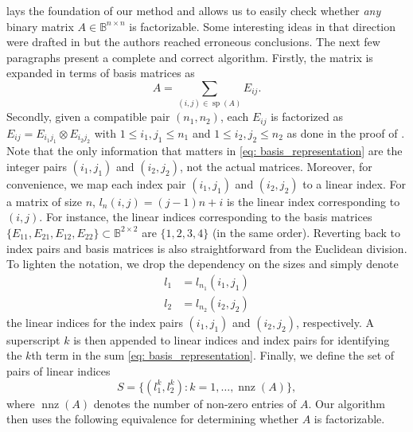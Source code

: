 \documentclass{article}
\numberwithin{equation}{section}
\DeclareMathOperator{\nnz}{\operatorname{nnz}}
\DeclareMathOperator{\sparsity}{\operatorname{sp}}
\theoremstyle{definition}
\begin{document}
 lays the foundation of our method and allows us to easily check whether \emph{any} binary matrix $A \in \mathbb{B}^{n \times n}$ is factorizable. Some interesting ideas in that direction were drafted in \cite{wei2023kronecker} but the authors reached erroneous conclusions. The next few paragraphs present a complete and correct algorithm. Firstly, the matrix is expanded in terms of basis matrices as
\begin{equation}
\label{eq: basis_representation}
    A = \sum_{(i,j) \in \sparsity(A)} E_{ij}.
\end{equation}
Secondly, given a compatible pair $(n_1,n_2)$, each $E_{ij}$ is factorized as $E_{ij} = E_{i_1 j_1} \otimes E_{i_2 j_2}$ with $1 \leq i_1,j_1 \leq n_1$ and $1 \leq i_2,j_2 \leq n_2$ as done in the proof of . Note that the only information that matters in \eqref{eq: basis_representation} are the integer pairs $(i_1,j_1)$ and $(i_2,j_2)$, not the actual matrices. Moreover, for convenience, we map each index pair $(i_1,j_1)$ and $(i_2,j_2)$ to a linear index. For a matrix of size $n$, $l_n(i,j)=(j-1)n+i$ is the linear index corresponding to $(i,j)$. For instance, the linear indices corresponding to the basis matrices $\{E_{11}, E_{21}, E_{12}, E_{22}\} \subset \mathbb{B}^{2 \times 2}$ are $\{1,2,3,4\}$ (in the same order). Reverting back to index pairs and basis matrices is also straightforward from the Euclidean division. To lighten the notation, we drop the dependency on the sizes and simply denote
\begin{align*}
    l_1&=l_{n_1}(i_1,j_1) \\
    l_2&=l_{n_2}(i_2,j_2)
\end{align*}
the linear indices for the index pairs $(i_1,j_1)$ and $(i_2,j_2)$, respectively. A superscript $k$ is then appended to linear indices and index pairs for identifying the $k$th term in the sum \eqref{eq: basis_representation}. Finally, we define the set of pairs of linear indices
\begin{equation*}
    S = \{(l_1^k,l_2^k) \colon k=1,\dots,\nnz(A)\},
\end{equation*}
where $\nnz(A)$ denotes the number of non-zero entries of $A$. Our algorithm then uses the following equivalence for determining whether $A$ is factorizable.
\end{document}
